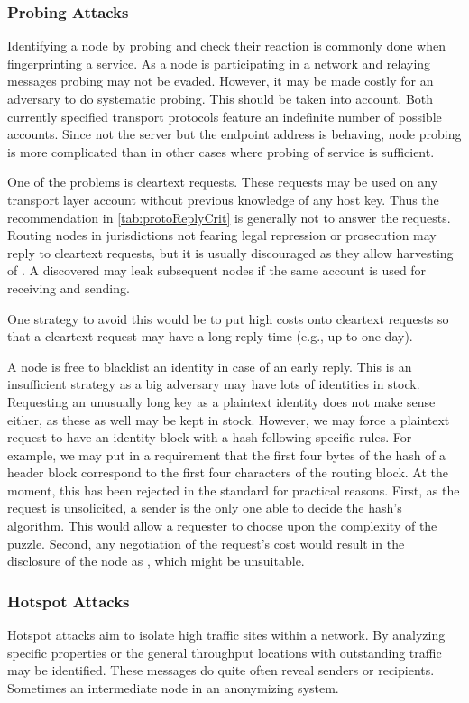 \subsubsection{Probing Attacks}
Identifying a node by probing and check their reaction is commonly done when fingerprinting a service. As a node is participating in a network and relaying messages probing may not be evaded. However, it may be made costly for an adversary to do systematic probing. This should be taken into account. Both currently specified transport protocols feature an indefinite number of possible accounts. Since not the server but the endpoint address is behaving, node probing is more complicated than in other cases where probing of service is sufficient. 

One of the problems is cleartext requests. These requests may be used on any transport layer account without previous knowledge of any host key. Thus the recommendation in \cref{tab:protoReplyCrit} is generally not to answer the requests. Routing nodes in jurisdictions not fearing legal repression or prosecution may reply to cleartext requests, but it is usually discouraged as they allow harvesting of \VortexNodes{}. A discovered \VortexNode{} may leak subsequent nodes if the same account is used for receiving and sending.

One strategy to avoid this would be to put high costs onto cleartext requests so that a cleartext request may have a long reply time (e.g., up to one day). 

A node is free to blacklist an identity in case of an early reply. This is an insufficient strategy as a big adversary may have lots of identities in stock. Requesting an unusually long key as a plaintext identity does not make sense either, as these as well may be kept in stock. However, we may force a plaintext request to have an identity block with a hash following specific rules. For example, we may put in a requirement that the first four bytes of the hash of a header block correspond to the first four characters of the routing block. At the moment, this has been rejected in the standard for practical reasons. First, as the request is unsolicited, a sender is the only one able to decide the hash's algorithm. This would allow a requester to choose upon the complexity of the puzzle. Second, any negotiation of the request's cost would result in the disclosure of the node as \VortexNode, which might be unsuitable.

\subsubsection{Hotspot Attacks}
Hotspot attacks aim to isolate high traffic sites within a network. By analyzing specific properties or the general throughput locations with outstanding traffic may be identified. These messages do quite often reveal senders or recipients. Sometimes an intermediate node in an anonymizing system. 

